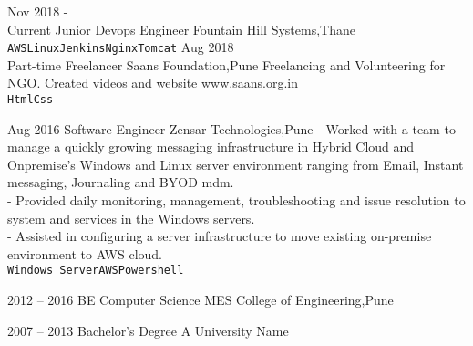 \documentclass[9pt]{developercv} %
\begin{document}

\begin{entrylist}
	\entry
		{Nov 2018 -\\Current}
		{Junior Devops Engineer}
		{Fountain Hill Systems,Thane}
		{\lorem \lorem \lorem\\ \texttt{AWS}\slashsep\texttt{Linux}\slashsep\texttt{Jenkins}\slashsep\texttt{Nginx}\slashsep\texttt{Tomcat}}
	\entry
		{Aug 2018\\\footnotesize{Part-time}}
		{Freelancer}
		{Saans Foundation,Pune}
		{Freelancing and Volunteering for NGO. Created videos and website www.saans.org.in\\\texttt{Html}\slashsep\texttt{Css}}
		
	\entry
		{Aug 2016}
		{Software Engineer}
		{Zensar Technologies,Pune}
		{- Worked with a team to manage a quickly growing messaging infrastructure in Hybrid Cloud and Onpremise's Windows and Linux server
environment ranging
from Email, Instant messaging, Journaling and BYOD mdm.\\- Provided daily monitoring, management, troubleshooting and issue resolution to
system and services in the Windows servers.\\ - Assisted in configuring a server infrastructure to move existing on-premise
environment to AWS cloud.\\ \texttt{Windows Server}\slashsep\texttt{AWS}\slashsep\texttt{Powershell}}
\end{entrylist}



\begin{entrylist}
	\entry
		{2012 -- 2016}
		{BE Computer Science}
		{MES College of Engineering,Pune}
		
	\entry
		{2007 -- 2013}
		{Bachelor's Degree}
		{A University Name}
		
\end{entrylist}

\end{document}
